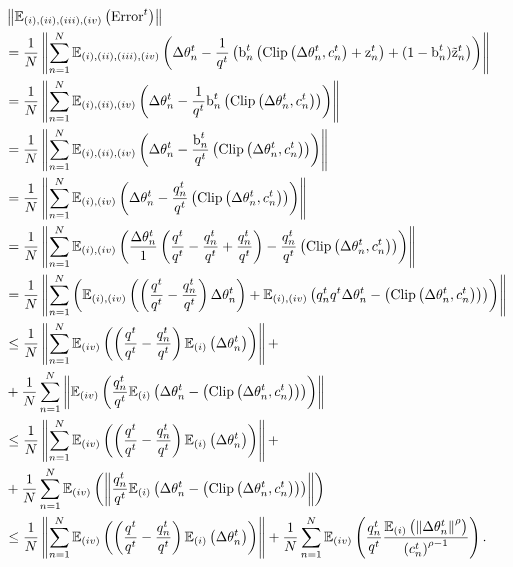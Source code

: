 \begin{align}
&\left\| \mathbb{E}_{(i),(ii),(iii), (iv)}\left({\text{Error}^t}\right)\right\| \nonumber 
\\
&= \frac{1}{N} \left\| \sum_{n=1}^N \mathbb{E}_{(i),(ii),(iii), (iv)}\left({\Delta {\theta}_n^t -  \frac{1}{q^t}\left({\textnormal{b}}_n^t \left(\text{Clip}\left({\Delta {\theta}_n^t}, c_n^t\right)+{\textnormal{z}}_n^t\right)+ (1-{\textnormal{b}}_n^t)\tilde{{\textnormal{z}}}_n^t\right)}\right) \right\|
\nonumber
\\
&= \frac{1}{N} \left\| \sum_{n=1}^N \mathbb{E}_{(i),(ii), (iv)}\left({\Delta {\theta}_n^t -  \frac{1}{q^t}{\textnormal{b}}_n^t \left(\text{Clip}\left({\Delta {\theta}_n^t}, c_n^t\right)\right)}\right) \right\|
\label{app:THM:clip_aware2:2}
\\
& = \frac{1}{N} \left\| \sum_{n=1}^N \mathbb{E}_{(i),(ii), (iv)}\left({{\Delta {\theta}_n^t} -  \frac{{\textnormal{b}}_n^t}{q^t} \left(\text{Clip}\left({\Delta {\theta}_n^t}, c_n^t\right)\right)}\right) \right\|
\label{app:THM:clip_aware2:3}
\\
& = \frac{1}{N} \left\| \sum_{n=1}^N \mathbb{E}_{(i), (iv)}\left({{\Delta {\theta}_n^t} -  \frac{q_n^t}{q^t} \left(\text{Clip}\left({\Delta {\theta}_n^t}, c_n^t\right)\right)}\right) \right\|
\label{app:THM:clip_aware2:4}
\\
& = \frac{1}{N} \left\| \sum_{n=1}^N \mathbb{E}_{(i), (iv)}\left({\frac{\Delta {\theta}_n^t}{1}\left(\frac{q^t}{q^t} - \frac{q_n^t}{q^t} + \frac{q_n^t}{q^t}\right) -  \frac{q_n^t}{q^t} \left(\text{Clip}\left({\Delta {\theta}_n^t}, c_n^t\right)\right)}\right) \right\|
\label{app:THM:clip_aware2:5}
\\
& = \frac{1}{N} \left\| \sum_{n=1}^N \left(\mathbb{E}_{(i),(iv)}\left({\left(\frac{q^t}{q^t} - \frac{q_n^t}{q^t}\right){\Delta {\theta}_n^t}}\right) + \mathbb{E}_{(i),(iv)}\left({{q_n^t}{q^t} {\Delta {\theta}_n^t}-   \left(\text{Clip}\left({\Delta {\theta}_n^t}, c_n^t\right)\right)}\right)\right) \right\|
\label{app:THM:clip_aware2:6}
\\
&\leq \frac{1}{N} \left\| \sum_{n=1}^N \mathbb{E}_{(iv)}\left({\left(\frac{q^t}{q^t} - \frac{q_n^t}{q^t}\right)\mathbb{E}_{(i)}\left({{\Delta {\theta}_n^t}}\right)}\right)\right\| + \nonumber
\\
&+ \frac{1}{N}\sum_{n=1}^N\left\|\mathbb{E}_{(iv)}\left({\frac{q_n^t}{q^t} \mathbb{E}_{(i)}\left({{\Delta {\theta}_n^t}-   \left(\text{Clip}\left({\Delta {\theta}_n^t}, c_n^t\right)\right)}\right)}\right) \right\|
\label{app:THM:clip_aware2:7}
\\
&\leq \frac{1}{N} \left\| \sum_{n=1}^N \mathbb{E}_{(iv)}\left({\left(\frac{q^t}{q^t} - \frac{q_n^t}{q^t}\right)\mathbb{E}_{(i)}\left({{\Delta {\theta}_n^t}}\right)}\right)\right\| + \nonumber
\\
&+ \frac{1}{N}\sum_{n=1}^N\mathbb{E}_{(iv)}\left({\left\|\frac{q_n^t}{q^t} \mathbb{E}_{(i)}\left({{\Delta {\theta}_n^t}-   \left(\text{Clip}\left({\Delta {\theta}_n^t}, c_n^t\right)\right)}\right) \right\|}\right)
\label{app:THM:clip_aware2:8}
\\
&\leq \frac{1}{N} \left\| \sum_{n=1}^N\mathbb{E}_{(iv)}\left({ \left(\frac{q^t}{q^t} - \frac{q_n^t}{q^t}\right)\mathbb{E}_{(i)}\left({{\Delta {\theta}_n^t}}\right)}\right)\right\| + \frac{1}{N}\sum_{n=1}^N \mathbb{E}_{(iv)}\left({\frac{q_n^t}{q^t}  \frac{\mathbb{E}_{(i)}\left({\left\|{\Delta {\theta}_n^t}\right\|^{\rho}}\right)}{\left(c_n^t\right)^{\rho-1}}}\right). \label{app:THM:clip_aware2:9}
\end{align}

